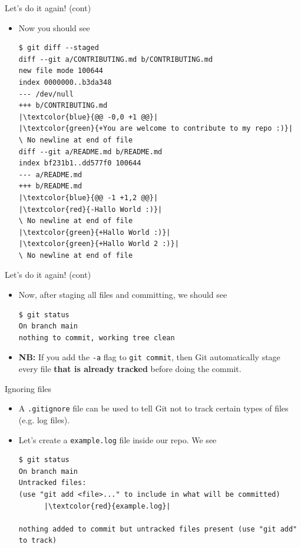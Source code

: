 \documentclass[
hyperref={bookmarks=false},
xcolor={dvipsnames,svgnames*,x11names*}, 
12pt
]{beamer}
\begin{document}
\begin{frame}[fragile]{Let's do it again! (cont)}
\vspace{-0.5cm}
\begin{itemize}
\itemsep 2ex
\item Now you should see
\begin{lstlisting}
$ git diff --staged
diff --git a/CONTRIBUTING.md b/CONTRIBUTING.md
new file mode 100644
index 0000000..b3da348
--- /dev/null
+++ b/CONTRIBUTING.md
|\textcolor{blue}{@@ -0,0 +1 @@}|
|\textcolor{green}{+You are welcome to contribute to my repo :)}|
\ No newline at end of file
diff --git a/README.md b/README.md
index bf231b1..dd577f0 100644
--- a/README.md
+++ b/README.md
|\textcolor{blue}{@@ -1 +1,2 @@}|
|\textcolor{red}{-Hallo World :)}|
\ No newline at end of file
|\textcolor{green}{+Hallo World :)}|
|\textcolor{green}{+Hallo World 2 :)}|
\ No newline at end of file
\end{lstlisting}
\end{itemize}
\end{frame}

\begin{frame}[fragile]{Let's do it again! (cont)}
\vspace{-0.5cm}
\begin{itemize}
\itemsep 2ex
\item Now, after staging all files and committing, we should see 
\begin{lstlisting}
$ git status
On branch main
nothing to commit, working tree clean
\end{lstlisting}
\item \textbf{NB:} If you add the \texttt{-a} flag to \texttt{git commit}, then Git automatically stage every file \textbf{that is already tracked} before doing the commit. 
\end{itemize}
\end{frame}

\begin{frame}[fragile]{Ignoring files}
\vspace{-0.5cm}
\begin{itemize}
\itemsep 2ex
\item A \texttt{.gitignore} file can be used to tell Git not to track certain types of files (e.g. log files). 
\item Let's create a \texttt{example.log} file inside our repo. We see 
\begin{lstlisting}
$ git status
On branch main
Untracked files:
(use "git add <file>..." to include in what will be committed)
      |\textcolor{red}{example.log}|

nothing added to commit but untracked files present (use "git add" to track)
\end{lstlisting}
\end{itemize}
\end{frame}
\end{document}

